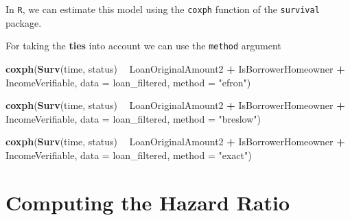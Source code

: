 \documentclass[]{book}
\makeatletter
\newenvironment{Shaded}{\begin{snugshade}}{\end{snugshade}}
\newcommand{\KeywordTok}[1]{\textcolor[rgb]{0.13,0.29,0.53}{\textbf{#1}}}
\newcommand{\DataTypeTok}[1]{\textcolor[rgb]{0.13,0.29,0.53}{#1}}
\newcommand{\DecValTok}[1]{\textcolor[rgb]{0.00,0.00,0.81}{#1}}
\newcommand{\StringTok}[1]{\textcolor[rgb]{0.31,0.60,0.02}{#1}}
\newcommand{\OperatorTok}[1]{\textcolor[rgb]{0.81,0.36,0.00}{\textbf{#1}}}
\newcommand{\NormalTok}[1]{#1}
\newenvironment{kframe}{%
\medskip{}
\setlength{\fboxsep}{.8em}
 \def\at@end@of@kframe{}%
 \ifinner\ifhmode%
  \def\at@end@of@kframe{\end{minipage}}%
  \begin{minipage}{\columnwidth}%
 \fi\fi%
 \def\FrameCommand##1{\hskip\@totalleftmargin \hskip-\fboxsep
 \colorbox{shadecolor}{##1}\hskip-\fboxsep
     \hskip-\linewidth \hskip-\@totalleftmargin \hskip\columnwidth}%
 \MakeFramed {\advance\hsize-\width
   \@totalleftmargin\z@ \linewidth\hsize
   \@setminipage}}%
 {\par\unskip\endMakeFramed%
 \at@end@of@kframe}
\renewenvironment{Shaded}{\begin{kframe}}{\end{kframe}}
\theoremstyle{definition}
\theoremstyle{definition}
\theoremstyle{definition}
\theoremstyle{remark}
\makeatother
\begin{document}
In \texttt{R}, we can estimate this model using the \texttt{coxph}
function of the \texttt{survival} package.

\begin{Shaded}
\end{Shaded}

For taking the \textbf{ties} into account we can use the \texttt{method}
argument

\begin{Shaded}
\begin{Highlighting}[]
\KeywordTok{coxph}\NormalTok{(}\KeywordTok{Surv}\NormalTok{(time, status) }\OperatorTok{~}\StringTok{ }\NormalTok{LoanOriginalAmount2 }\OperatorTok{+}\StringTok{ }\NormalTok{IsBorrowerHomeowner }\OperatorTok{+}
\StringTok{        }\NormalTok{IncomeVerifiable, }\DataTypeTok{data =}\NormalTok{ loan_filtered, }\DataTypeTok{method =} \StringTok{"efron"}\NormalTok{) }

\KeywordTok{coxph}\NormalTok{(}\KeywordTok{Surv}\NormalTok{(time, status) }\OperatorTok{~}\StringTok{ }\NormalTok{LoanOriginalAmount2 }\OperatorTok{+}\StringTok{ }\NormalTok{IsBorrowerHomeowner }\OperatorTok{+}
\StringTok{        }\NormalTok{IncomeVerifiable, }\DataTypeTok{data =}\NormalTok{ loan_filtered, }\DataTypeTok{method =} \StringTok{"breslow"}\NormalTok{) }

\KeywordTok{coxph}\NormalTok{(}\KeywordTok{Surv}\NormalTok{(time, status) }\OperatorTok{~}\StringTok{ }\NormalTok{LoanOriginalAmount2 }\OperatorTok{+}\StringTok{ }\NormalTok{IsBorrowerHomeowner }\OperatorTok{+}
\StringTok{        }\NormalTok{IncomeVerifiable, }\DataTypeTok{data =}\NormalTok{ loan_filtered, }\DataTypeTok{method =} \StringTok{"exact"}\NormalTok{) }
\end{Highlighting}
\end{Shaded}

\section{Computing the Hazard Ratio}\label{computing-the-hazard-ratio}
\end{document}
